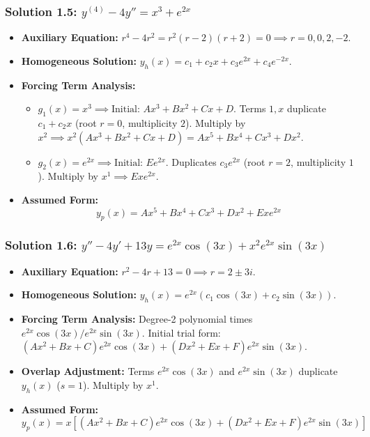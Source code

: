 \documentclass[11pt,letterpaper]{article}
\begin{document}
\subsubsection*{Solution 1.5: $y^{(4)} - 4y'' = x^3 + e^{2x}$}
\begin{itemize}
    \item \textbf{Auxiliary Equation:} $r^4 - 4r^2 = r^2 (r-2)(r+2) = 0 \implies r = 0, 0, 2, -2$.
    \item \textbf{Homogeneous Solution:} $y_h(x) = c_1 + c_2 x + c_3 e^{2x} + c_4 e^{-2x}$.
    \item \textbf{Forcing Term Analysis:}
    \begin{itemize}
        \item $g_1(x) = x^3 \implies \text{Initial: } A x^3 + B x^2 + C x + D$. Terms $1, x$ duplicate $c_1 + c_2 x$ (root $r=0$, multiplicity $2$). Multiply by $x^2 \implies x^2(A x^3 + B x^2 + C x + D) = A x^5 + B x^4 + C x^3 + D x^2$.
        \item $g_2(x) = e^{2x} \implies \text{Initial: } E e^{2x}$. Duplicates $c_3 e^{2x}$ (root $r=2$, multiplicity $1$). Multiply by $x^1 \implies E x e^{2x}$.
    \end{itemize}
    \item \textbf{Assumed Form:}
    \[ y_p(x) = A x^5 + B x^4 + C x^3 + D x^2 + E x e^{2x} \]
\end{itemize}

\subsubsection*{Solution 1.6: $y'' - 4y' + 13y = e^{2x} \cos(3x) + x^2 e^{2x} \sin(3x)$}
\begin{itemize}
    \item \textbf{Auxiliary Equation:} $r^2 - 4r + 13 = 0 \implies r = 2 \pm 3i$.
    \item \textbf{Homogeneous Solution:} $y_h(x) = e^{2x} (c_1 \cos(3x) + c_2 \sin(3x))$.
    \item \textbf{Forcing Term Analysis:} Degree-2 polynomial times $e^{2x} \cos(3x) / e^{2x} \sin(3x)$. Initial trial form: $(A x^2 + B x + C) e^{2x} \cos(3x) + (D x^2 + E x + F) e^{2x} \sin(3x)$.
    \item \textbf{Overlap Adjustment:} Terms $e^{2x} \cos(3x)$ and $e^{2x} \sin(3x)$ duplicate $y_h(x)$ ($s=1$). Multiply by $x^1$.
    \item \textbf{Assumed Form:}
    \[ y_p(x) = x \left[ (A x^2 + B x + C) e^{2x} \cos(3x) + (D x^2 + E x + F) e^{2x} \sin(3x) \right] \]
\end{itemize}
\end{document}
